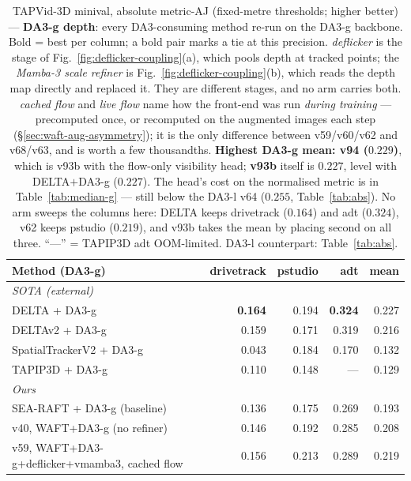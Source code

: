 \documentclass[11pt,a4paper]{article}
\begin{document}
\begin{table}[!ht]
\centering
\caption{TAPVid-3D minival, absolute metric-AJ (fixed-metre thresholds; higher better) ---
         \textbf{DA3-g depth}: every DA3-consuming method re-run on the DA3-g backbone. Bold = best per
         column; a bold pair marks a tie at this precision.
         \emph{deflicker} is the stage of Fig.~\ref{fig:deflicker-coupling}(a), which pools depth at
         tracked points; the \emph{Mamba-3 scale refiner} is Fig.~\ref{fig:deflicker-coupling}(b),
         which reads the depth map directly and replaced it. They are different stages, and no arm
         carries both. \emph{cached flow} and \emph{live flow} name how the front-end was run
         \emph{during training} --- precomputed once, or recomputed on the augmented images each
         step (\S\ref{sec:waft-aug-asymmetry}); it is the only difference between v59/v60/v62 and
         v68/v63, and is worth a few thousandths.
         \textbf{Highest DA3-g mean: v94 ($0.229$)}, which is v93b with the flow-only visibility head; \textbf{v93b} itself is $0.227$, level with DELTA$+$DA3-g ($0.227$). The head's cost on the normalised metric is in Table~\ref{tab:median-g}
         --- still below the DA3-l v64 ($0.255$, Table~\ref{tab:abs}). No arm sweeps the columns
         here: DELTA keeps drivetrack ($0.164$) and adt ($0.324$), v62 keeps pstudio ($0.219$), and
         v93b takes the mean by placing second on all three.
         ``---'' = TAPIP3D adt OOM-limited. DA3-l counterpart: Table~\ref{tab:abs}.}
\label{tab:abs-g}
\footnotesize
\begin{tabular}{lrrrr}
\toprule
Method (DA3-g) & drivetrack & pstudio & adt & mean \\
\midrule
\multicolumn{5}{l}{\emph{SOTA (external)}} \\
DELTA + DA3-g            & \textbf{0.164} & 0.194 & \textbf{0.324} & 0.227 \\
DELTAv2 + DA3-g          & 0.159 & 0.171 & 0.319 & 0.216 \\
SpatialTrackerV2 + DA3-g & 0.043 & 0.184 & 0.170 & 0.132 \\
TAPIP3D + DA3-g          & 0.110 & 0.148 & ---   & 0.129 \\
\midrule
\multicolumn{5}{l}{\emph{Ours}} \\
SEA-RAFT + DA3-g (baseline)  & 0.136 & 0.175 & 0.269 & 0.193 \\
v40, WAFT+DA3-g (no refiner) & 0.146 & 0.192 & 0.285 & 0.208 \\
v59, WAFT+DA3-g+deflicker+vmamba3, cached flow & 0.156 & 0.213 & 0.289 & 0.219 \\

\end{tabular}
\end{table}
\end{document}
